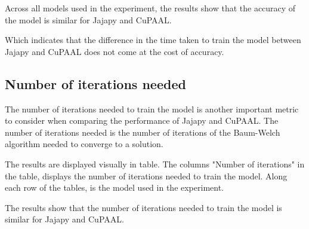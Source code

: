 Across all models used in the experiment, the results show that the accuracy of the model is similar for Jajapy and CuPAAL.

Which indicates that the difference in the time taken to train the model between Jajapy and CuPAAL does not come at the cost of accuracy.


\subsection{Number of iterations needed}\label{subsec:results_iterations}
The number of iterations needed to train the model is another important metric to consider when comparing the performance of Jajapy and CuPAAL.
The number of iterations needed is the number of iterations of the Baum-Welch algorithm needed to converge to a solution.

The results are displayed visually in table.
The columns "Number of iterations" in the table, displays the number of iterations needed to train the model.
Along each row of the tables, is the model used in the experiment.

The results show that the number of iterations needed to train the model is similar for Jajapy and CuPAAL.

